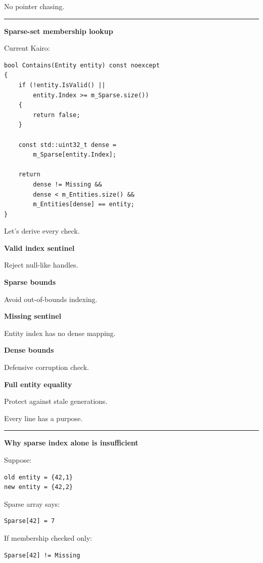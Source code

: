 No pointer chasing.

\begin{center}\rule{0.5\linewidth}{0.5pt}\end{center}

\textbf{Sparse-set membership lookup}

Current Kairo:

\begin{verbatim}
bool Contains(Entity entity) const noexcept
{
    if (!entity.IsValid() ||
        entity.Index >= m_Sparse.size())
    {
        return false;
    }

    const std::uint32_t dense =
        m_Sparse[entity.Index];

    return
        dense != Missing &&
        dense < m_Entities.size() &&
        m_Entities[dense] == entity;
}
\end{verbatim}

Let's derive every check.

\textbf{Valid index sentinel}

Reject null-like handles.

\textbf{Sparse bounds}

Avoid out-of-bounds indexing.

\textbf{Missing sentinel}

Entity index has no dense mapping.

\textbf{Dense bounds}

Defensive corruption check.

\textbf{Full entity equality}

Protect against stale generations.

Every line has a purpose.

\begin{center}\rule{0.5\linewidth}{0.5pt}\end{center}

\textbf{Why sparse index alone is insufficient}

Suppose:

\begin{verbatim}
old entity = {42,1}
new entity = {42,2}
\end{verbatim}

Sparse array says:

\begin{verbatim}
Sparse[42] = 7
\end{verbatim}

If membership checked only:

\begin{verbatim}
Sparse[42] != Missing
\end{verbatim}

